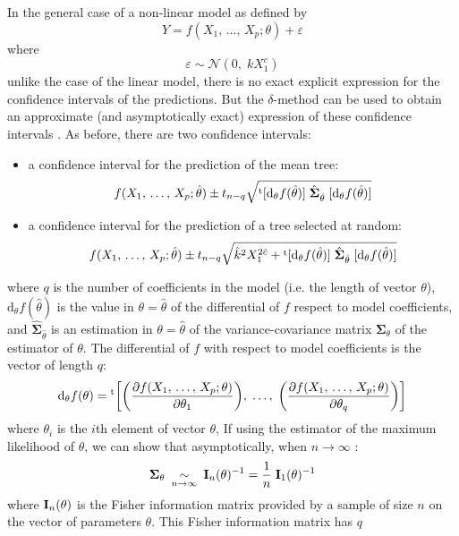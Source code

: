 In the general case of a non-linear model as defined by
\[
Y=f(X_1,\,\ldots,\,X_p;\theta)+\varepsilon
\]
where
\[
\varepsilon\mathop{\sim}\mathcal{N}(0,\;kX_1^c)
\]
unlike the case of the linear model, there is no exact explicit expression for the confidence intervals of the predictions. But the $\delta$-method can be used to obtain an approximate (and asymptotically exact) expression of these confidence intervals \citep{serfling80}. As before, there are two confidence intervals:
\begin{itemize}
\item a confidence interval for the prediction of the mean tree:
\begin{equation}
f(X_1,\,\ldots,\,X_p;\hat{\theta})\pm t_{n-q}
\sqrt{{}^{\mathrm{t}}[\mathrm{d}_{\theta}f(\hat{\theta})]\;\hat{\boldsymbol{\Sigma}}_{\hat{\theta}}\;
[\mathrm{d}_{\theta}f(\hat{\theta})]}\label{icnl0}
\end{equation}
\item a confidence interval for the prediction of a tree selected at random:
\begin{equation}
f(X_1,\,\ldots,\,X_p;\hat{\theta})\pm t_{n-q}
\sqrt{\hat{k}^2X_1^{2\hat{c}}+
{}^{\mathrm{t}}[\mathrm{d}_{\theta}f(\hat{\theta})]\;\hat{\boldsymbol{\Sigma}}_{\hat{\theta}}\;
[\mathrm{d}_{\theta}f(\hat{\theta})]}\label{icnl1}
\end{equation}
\end{itemize}
where $q$ is the number of coefficients in the model (i.e. the length of vector $\theta$),
$\mathrm{d}_{\theta}f(\hat{\theta})$ is the value in 
$\theta=\hat{\theta}$ of the differential of $f$ respect to model coefficients, and 
$\hat{\boldsymbol{\Sigma}}_{\hat{\theta}}$ is an estimation in 
$\theta=\hat{\theta}$ of the variance-covariance matrix 
$\boldsymbol{\Sigma}_{\theta}$ of the estimator of $\theta$. The differential of $f$ with respect to model coefficients is the vector of length $q$:
\[
\mathrm{d}_{\theta}f(\theta)={}^{\mathrm{t}}\bigg[\bigg(\frac{\partial
f(X_1,\,\ldots,\,X_p;\theta)}{\partial\theta_1}\bigg),\; \ldots,\;
\bigg(\frac{\partial
f(X_1,\,\ldots,\,X_p;\theta)}{\partial\theta_q}\bigg)\bigg]
\]
where $\theta_i$ is the $i$th element of vector $\theta$,
If using the estimator of the maximum likelihood of 
$\theta$, we can show that asymptotically, when 
$n\rightarrow\infty$ \citep[p.301]{saporta90}:
\[
\boldsymbol{\Sigma}_{\theta}\ \mathop{\sim}_{n\rightarrow\infty}\
\matx{I}_n(\theta)^{-1}=\frac{1}{n}\; \matx{I}_1(\theta)^{-1}
\]
where $\mathbf{I}_n(\theta)$ is the Fisher information matrix provided by a sample of size $n$ on the vector of parameters $\theta$. This Fisher information matrix has $q$
